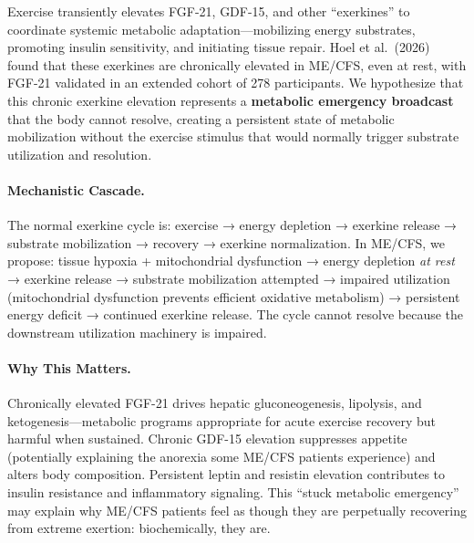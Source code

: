 \begin{hypothesis}
\label{hyp:chronic-exerkine}

Exercise transiently elevates FGF-21, GDF-15, and other ``exerkines'' to coordinate systemic metabolic adaptation---mobilizing energy substrates, promoting insulin sensitivity, and initiating tissue repair. Hoel et al.\ (2026)~\cite{Hoel2026proteome} found that these exerkines are chronically elevated in ME/CFS, even at rest, with FGF-21 validated in an extended cohort of 278 participants. We hypothesize that this chronic exerkine elevation represents a \textbf{metabolic emergency broadcast} that the body cannot resolve, creating a persistent state of metabolic mobilization without the exercise stimulus that would normally trigger substrate utilization and resolution.

\paragraph{Mechanistic Cascade.}
The normal exerkine cycle is: exercise → energy depletion → exerkine release → substrate mobilization → recovery → exerkine normalization. In ME/CFS, we propose: tissue hypoxia + mitochondrial dysfunction → energy depletion \textit{at rest} → exerkine release → substrate mobilization attempted → impaired utilization (mitochondrial dysfunction prevents efficient oxidative metabolism) → persistent energy deficit → continued exerkine release. The cycle cannot resolve because the downstream utilization machinery is impaired.

\paragraph{Why This Matters.}
Chronically elevated FGF-21 drives hepatic gluconeogenesis, lipolysis, and ketogenesis---metabolic programs appropriate for acute exercise recovery but harmful when sustained. Chronic GDF-15 elevation suppresses appetite (potentially explaining the anorexia some ME/CFS patients experience) and alters body composition. Persistent leptin and resistin elevation contributes to insulin resistance and inflammatory signaling. This ``stuck metabolic emergency'' may explain why ME/CFS patients feel as though they are perpetually recovering from extreme exertion: biochemically, they are.


\end{hypothesis}
